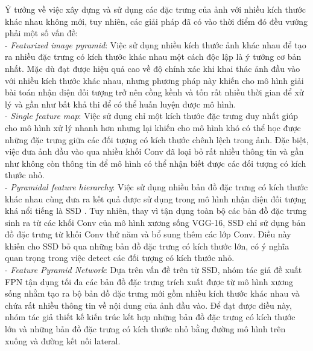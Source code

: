 {    \noindent
    Ý tưởng về việc xây dựng và sử dụng các đặc trưng của ảnh với nhiều kích thước khác nhau không mới, tuy nhiên, các giải pháp đã có vào thời điểm đó đều vướng phải một số vấn đề: \\
    - \textit{Featurized image pyramid}: Việc sử dụng nhiều kích thước ảnh khác nhau để tạo ra nhiều đặc trưng có kích thước khác nhau một cách độc lập là ý tưởng cơ bản nhất. Mặc dù đạt được hiệu quả cao về độ chính xác khi khai thác ảnh đầu vào với nhiều kích thước khác nhau, nhưng phương pháp này khiến cho mô hình giải bài toán nhận diện đối tượng trở nên cồng kềnh và tốn rất nhiều thời gian để xử lý và gần như bất khả thi để có thể huấn luyện được mô hình. \\
    - \textit{Single feature map}: Việc sử dụng chỉ một kích thước đặc trưng duy nhất giúp cho mô hình xử lý nhanh hơn nhưng lại khiến cho mô hình khó có thể học được những đặc trưng giữa các đối tượng có kích thước chênh lệch trong ảnh. Đặc biệt, việc đưa ảnh đầu vào qua nhiều khối Conv đã loại bỏ rất nhiều thông tin và gần như không còn thông tin để mô hình có thể nhận biết được các đối tượng có kích thước nhỏ. \\
    - \textit{Pyramidal feature hierarchy}: Việc sử dụng nhiều bản đồ đặc trưng có kích thước khác nhau cùng đưa ra kết quả được sử dụng trong mô hình nhận diện đối tượng khá nổi tiếng là SSD \cite{liu2016ssd}. Tuy nhiên, thay vì tận dụng toàn bộ các bản đồ đặc trưng sinh ra từ các khối Conv của mô hình xương sống VGG-16, SSD chỉ sử dụng bản đồ đặc trưng từ khối Conv thứ năm và bổ sung thêm các lớp Conv. Điều này khiến cho SSD bỏ qua những bản đồ đặc trưng có kích thước lớn, có ý nghĩa quan trọng trong việc detect các đối tượng có kích thước nhỏ. \\
    - \textit{Feature Pyramid Network}: Dựa trên vấn đề trên từ SSD, nhóm tác giả đề xuất FPN tận dụng tối đa các bản đồ đặc trưng trích xuất được từ mô hình xương sống nhằm tạo ra bộ bản đồ đặc trưng mới gồm nhiều kích thước khác nhau và chứa rất nhiều thông tin về nội dung của ảnh đầu vào. Để đạt được điều này, nhóm tác giả thiết kế kiến trúc kết hợp những bản đồ đặc trưng có kích thước lớn và những bản đồ đặc trưng có kích thước nhỏ bằng đường mô hình trên xuống và đường kết nối lateral.

}
